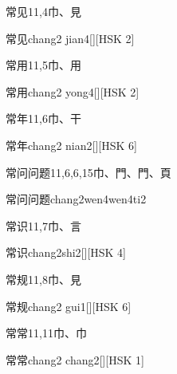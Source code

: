 \begin{Entry}{常见}{11,4}{⼱、⾒}
  \begin{Phonetics}{常见}{chang2 jian4}[][HSK 2]
  \end{Phonetics}
\end{Entry}

\begin{Entry}{常用}{11,5}{⼱、⽤}
  \begin{Phonetics}{常用}{chang2 yong4}[][HSK 2]
  \end{Phonetics}
\end{Entry}

\begin{Entry}{常年}{11,6}{⼱、⼲}
  \begin{Phonetics}{常年}{chang2 nian2}[][HSK 6]
  \end{Phonetics}
\end{Entry}

\begin{Entry}{常问问题}{11,6,6,15}{⼱、⾨、⾨、⾴}
  \begin{Phonetics}{常问问题}{chang2wen4wen4ti2}
  \end{Phonetics}
\end{Entry}

\begin{Entry}{常识}{11,7}{⼱、⾔}
  \begin{Phonetics}{常识}{chang2shi2}[][HSK 4]
  \end{Phonetics}
\end{Entry}

\begin{Entry}{常规}{11,8}{⼱、⾒}
  \begin{Phonetics}{常规}{chang2 gui1}[][HSK 6]
  \end{Phonetics}
\end{Entry}

\begin{Entry}{常常}{11,11}{⼱、⼱}
  \begin{Phonetics}{常常}{chang2 chang2}[][HSK 1]
  \end{Phonetics}
\end{Entry}


